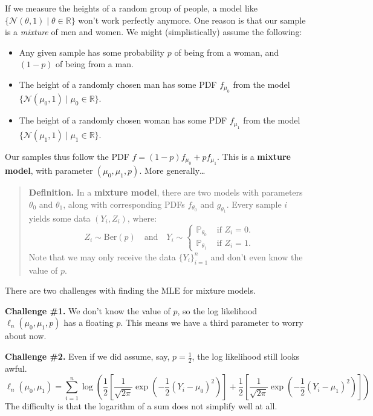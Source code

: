 If we measure the heights of a random group of people,
a model like $\{\mathcal{N}(\theta, 1) \mid \theta \in \mathbb{R}\}$
won't work perfectly anymore.
One reason is that our sample is a \emph{mixture}
of men and women.  We might (simplistically) assume the following:
\begin{itemize}
    \item Any given sample has some probability $p$ of being from a woman,
    and $(1 - p)$ of being from a man.
    \item The height of a randomly chosen man
    has some PDF $f_{\mu_0}$ from the model $\{\mathcal{N}(\mu_0, 1) \mid \mu_0 \in \mathbb{R}\}$.
    \item The height of a randomly chosen woman
    has some PDF $f_{\mu_1}$ from the model $\{\mathcal{N}(\mu_1, 1) \mid \mu_1 \in \mathbb{R}\}$.
\end{itemize}
Our samples thus follow the PDF
$f = (1 - p)f_{\mu_0} + pf_{\mu_1}$.  This is a \textbf{mixture model},
with parameter $(\mu_0, \mu_1, p)$.  More generally\dots

\begin{quote}
    \textbf{Definition.} In a \textbf{mixture model},
    there are two models with parameters $\theta_0$ and $\theta_1$,
    along with corresponding PDFs $f_{\theta_0}$ and $g_{\theta_1}$.
    Every sample $i$ yields some data $(Y_i, Z_i)$, where:
    \[ Z_i \sim \mathrm{Ber}(p) ~~~ \text{ and } ~~~
    Y_i \sim \begin{cases}
    \mathbb{P}_{\theta_0} & \text{ if } Z_i = 0. \\
    \mathbb{P}_{\theta_1} & \text{ if } Z_i = 1.
    \end{cases} \]
    Note that we may only receive the data $\{Y_i\}_{i = 1}^n$
    and don't even know the value of $p$.
\end{quote}

There are two challenges with finding the MLE for mixture models.

\textbf{Challenge \#1.} We don't know the value of $p$,
so the log likelihood $\ell_n(\mu_0, \mu_1, p)$ has a floating $p$.
This means we have a third parameter to worry about now.

\textbf{Challenge \#2.} Even if we did assume, say, $p = \frac{1}{2}$,
the log likelihood still looks awful.
\[ \ell_n(\mu_0, \mu_1) = \sum_{i = 1}^n \log\left(
    \frac{1}{2} \left[\frac{1}{\sqrt{2\pi}}\exp\left(
        -\frac{1}{2}(Y_i - \mu_0)^2
    \right)\right] +
    \frac{1}{2} \left[\frac{1}{\sqrt{2\pi}}\exp\left(
        -\frac{1}{2}(Y_i - \mu_1)^2
    \right)\right]
\right) \]
The difficulty is that the logarithm of a sum does not simplify well at all.

